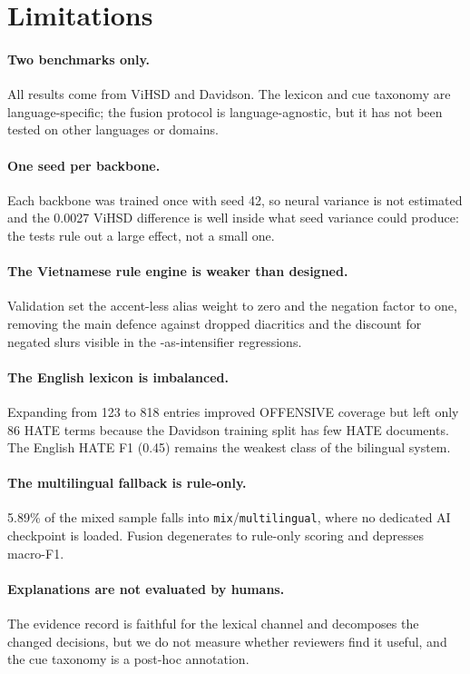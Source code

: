 \section{Limitations}
\label{sec:limitations}

\paragraph{Two benchmarks only.}  All results come from ViHSD and Davidson.
The lexicon and cue taxonomy are language-specific; the fusion protocol is
language-agnostic, but it has not been tested on other languages or domains.

\paragraph{One seed per backbone.}  Each backbone was trained once with seed 42,
so neural variance is not estimated and the 0.0027 ViHSD difference is well
inside what seed variance could produce: the tests rule out a large effect, not
a small one.

\paragraph{The Vietnamese rule engine is weaker than designed.}  Validation set
the accent-less alias weight to zero and the negation factor to one, removing
the main defence against dropped diacritics and the discount for negated slurs
visible in the \off{}-as-intensifier regressions.

\paragraph{The English lexicon is imbalanced.}  Expanding from 123 to 818
entries improved OFFENSIVE coverage but left only 86 HATE terms because the
Davidson training split has few HATE documents.  The English HATE F1 (0.45)
remains the weakest class of the bilingual system.

\paragraph{The multilingual fallback is rule-only.}  5.89\% of the mixed sample
falls into \texttt{mix}/\texttt{multilingual}, where no dedicated AI checkpoint
is loaded.  Fusion degenerates to rule-only scoring and depresses macro-F1.

\paragraph{Explanations are not evaluated by humans.}  The evidence record is
faithful for the lexical channel and decomposes the changed decisions, but we
do not measure whether reviewers find it useful, and the cue taxonomy is a
post-hoc annotation.